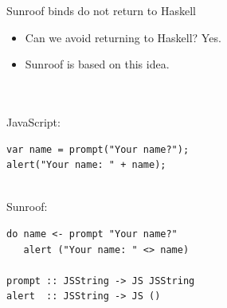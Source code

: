 \documentclass{beamer}
\begin{document}
\begin{frame}[fragile]{Sunroof binds do not return to Haskell}

\begin{itemize}
\item Can we avoid returning to Haskell? Yes. 
\item Sunroof is based on this idea.
\end{itemize}

~\\
~\\
JavaScript:

\begin{codeblock}[0.4]
\tiny
\begin{verbatim}
var name = prompt("Your name?");
alert("Your name: " + name);
\end{verbatim}
\end{codeblock}

~\\
Sunroof:

\begin{codeblock}[0.4]
\tiny
\begin{verbatim}
do name <- prompt "Your name?"
   alert ("Your name: " <> name)

prompt :: JSString -> JS JSString
alert  :: JSString -> JS ()
\end{verbatim}
\end{codeblock}

\end{frame}
\end{document}
